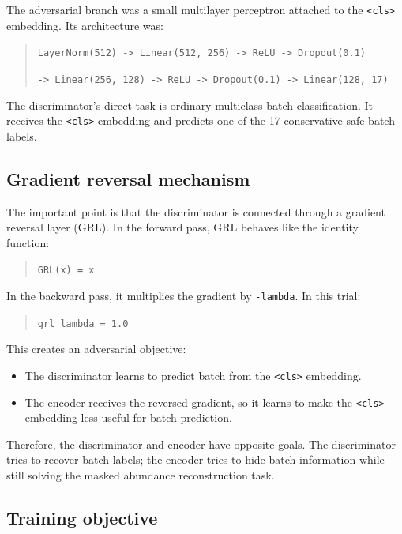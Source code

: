 \documentclass[11pt]{article}
\newcommand{\code}[1]{\texttt{\small #1}}
\begin{document}
The adversarial branch was a small multilayer perceptron attached to the \code{<cls>}
embedding. Its architecture was:

\begin{quote}
\code{LayerNorm(512) -> Linear(512, 256) -> ReLU -> Dropout(0.1)}

\code{-> Linear(256, 128) -> ReLU -> Dropout(0.1) -> Linear(128, 17)}
\end{quote}

The discriminator's direct task is ordinary multiclass batch classification. It receives
the \code{<cls>} embedding and predicts one of the 17 conservative-safe batch labels.

\subsection{Gradient reversal mechanism}

The important point is that the discriminator is connected through a gradient reversal
layer (GRL). In the forward pass, GRL behaves like the identity function:

\begin{quote}
\code{GRL(x) = x}
\end{quote}

In the backward pass, it multiplies the gradient by \code{-lambda}. In this trial:

\begin{quote}
\code{grl\_lambda = 1.0}
\end{quote}

This creates an adversarial objective:

\begin{itemize}
  \item The discriminator learns to predict batch from the \code{<cls>} embedding.
  \item The encoder receives the reversed gradient, so it learns to make the
  \code{<cls>} embedding less useful for batch prediction.
\end{itemize}

Therefore, the discriminator and encoder have opposite goals. The discriminator tries to
recover batch labels; the encoder tries to hide batch information while still solving the
masked abundance reconstruction task.

\subsection{Training objective}
\end{document}
